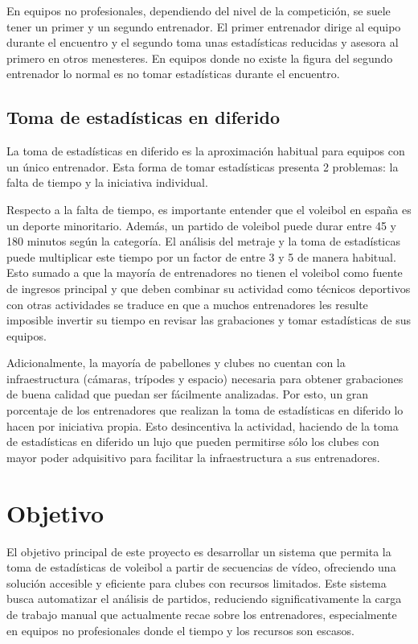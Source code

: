 \documentclass[12pt]{report} %
\begin{document}
    En equipos no profesionales, dependiendo del nivel de la competición, se
    suele tener un primer y un segundo entrenador. El primer entrenador dirige
    al equipo durante el encuentro y el segundo toma unas estadísticas
    reducidas y asesora al primero en otros menesteres. En equipos donde no
    existe la figura del segundo entrenador lo normal es no tomar estadísticas
    durante el encuentro.

    \section{Toma de estadísticas en diferido}

    La toma de estadísticas en diferido es la aproximación habitual para
    equipos con un único entrenador. Esta forma de tomar estadísticas presenta
    2 problemas: la falta de tiempo y la iniciativa individual.

    Respecto a la falta de tiempo, es importante entender que el voleibol en
    españa es un deporte minoritario. Además, un partido de voleibol puede durar
    entre 45 y 180 minutos según la categoría. El análisis del metraje y la
    toma de estadísticas puede multiplicar este tiempo por un factor de entre 3
    y 5 de manera habitual. Esto sumado a que la mayoría de entrenadores no
    tienen el voleibol como fuente de ingresos principal y que deben combinar
    su actividad como técnicos deportivos con otras actividades se
    traduce en que a muchos entrenadores les resulte imposible invertir su
    tiempo en revisar las grabaciones y tomar estadísticas de sus equipos.

    Adicionalmente, la mayoría de pabellones y clubes no cuentan con la
    infraestructura (cámaras, trípodes y espacio) necesaria para obtener
    grabaciones de buena calidad que puedan ser fácilmente analizadas. Por esto, 
    un gran porcentaje de los entrenadores que realizan la toma de estadísticas
    en diferido lo hacen por iniciativa propia. Esto desincentiva la actividad,
    haciendo de la toma de estadísticas en diferido un lujo que pueden
    permitirse sólo los clubes con mayor poder adquisitivo para facilitar la
    infraestructura a sus entrenadores.
    
    
    \chapter{Objetivo}
    \label{chap:metodos}

    El objetivo principal de este proyecto es desarrollar un sistema que
    permita la toma de estadísticas de voleibol a partir de secuencias de
    vídeo, ofreciendo una solución accesible y eficiente para clubes con
    recursos limitados. Este sistema busca automatizar el análisis de partidos,
    reduciendo significativamente la carga de trabajo manual que actualmente
    recae sobre los entrenadores, especialmente en equipos no profesionales
    donde el tiempo y los recursos son escasos.
\end{document}
